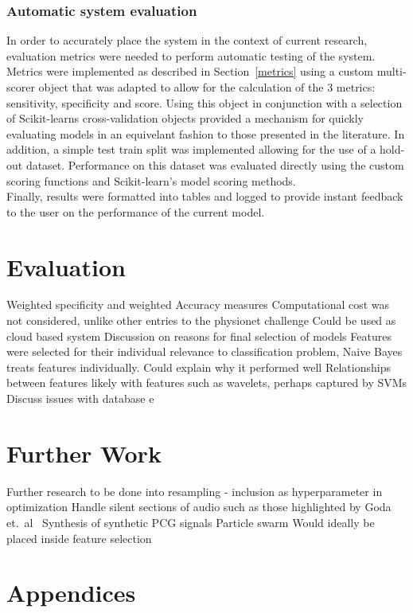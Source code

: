 \documentclass[titlepage, 12pt]{scrartcl} \usepackage{enumitem}
\begin{document}
\subsubsection{Automatic system evaluation}
In order to accurately place the system in the context of current research,
evaluation metrics were needed to perform automatic testing of the system. 
Metrics were implemented as described in Section~\ref{metrics} using a custom
multi-scorer object that  was adapted to allow for the calculation of the 3
metrics: sensitivity, specificity and score. Using this object in conjunction
with a selection of Scikit-learns cross-validation objects provided a mechanism
for quickly evaluating models in an equivelant fashion to those presented in
the literature. In addition, a simple test train split was implemented allowing
for the use of a hold-out dataset. Performance on this dataset was evaluated
directly using the custom scoring functions and Scikit-learn's model scoring
methods.\\
Finally, results were formatted into tables and logged to provide instant
feedback to the user on the performance of the current model.

\section{Evaluation}\label{Eval}
Weighted specificity and weighted Accuracy measures
Computational cost was not considered, unlike other entries to the physionet
challenge
Could be used as cloud based system
Discussion on reasons for final selection of models
Features were selected for their individual relevance to classification
problem, Naive Bayes treats features individually. Could explain why it
performed well
Relationships between features likely with features such as wavelets, perhaps
captured by SVMs
Discuss issues with database e

\section{Further Work}\label{FurtherWork}
Further research to be done into resampling - inclusion as hyperparameter in
optimization
Handle silent sections of audio such as those highlighted by Goda et.\
al~\parencite{Goda2016}
Synthesis of synthetic PCG signals
Particle swarm Would ideally be placed inside feature selection

\appendix
\section*{Appendices}
\renewcommand{\thesubsection}{\Alph{subsection}}
\end{document}
